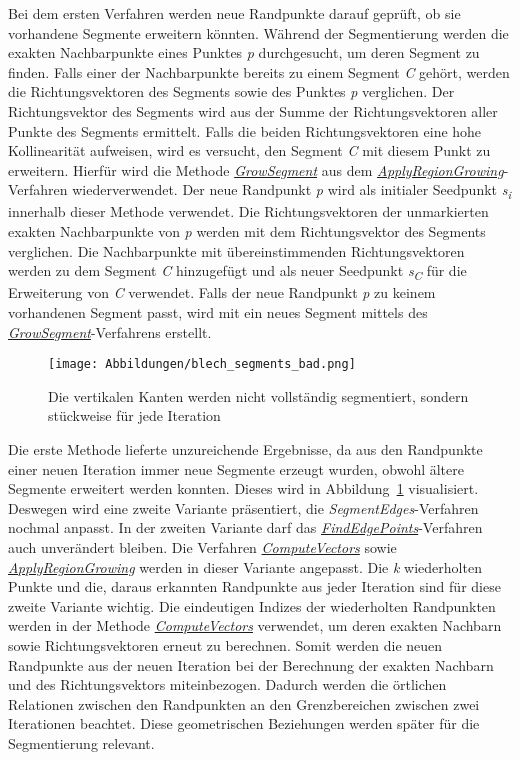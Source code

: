 Bei dem ersten Verfahren werden neue Randpunkte darauf geprüft, ob sie vorhandene Segmente erweitern könnten. Während der Segmentierung werden die exakten Nachbarpunkte eines Punktes \textit{p} durchgesucht, um deren Segment zu finden. Falls einer der Nachbarpunkte bereits zu einem Segment \textit{C} gehört, werden die Richtungsvektoren des Segments sowie des Punktes \textit{p} verglichen. Der Richtungsvektor des Segments wird aus der Summe der Richtungsvektoren aller Punkte des Segments ermittelt. Falls die beiden Richtungsvektoren eine hohe Kollinearität aufweisen, wird es versucht, den Segment \textit{C} mit diesem Punkt zu erweitern. Hierfür wird die Methode \textit{\hyperref[alg:grow_segment]{GrowSegment}} aus dem \textit{\hyperref[alg:apply_region_growing]{ApplyRegionGrowing}}-Verfahren wiederverwendet. Der neue Randpunkt \textit{p} wird als initialer Seedpunkt \textit{s\textsubscript{i}} innerhalb dieser Methode verwendet. Die Richtungsvektoren der unmarkierten exakten Nachbarpunkte von \textit{p} werden mit dem Richtungsvektor des Segments verglichen. Die Nachbarpunkte mit übereinstimmenden Richtungsvektoren werden zu dem Segment \textit{C} hinzugefügt und als neuer Seedpunkt \textit{s\textsubscript{C}} für die Erweiterung von \textit{C} verwendet. Falls der neue Randpunkt \textit{p} zu keinem vorhandenen Segment passt, wird mit ein neues Segment mittels des \textit{\hyperref[alg:grow_segment]{GrowSegment}}-Verfahrens erstellt.

\begin{figure}[b!]
	\texttt{[image: Abbildungen/blech\_segments\_bad.png]}
	\centering
	\caption[Falsch segmentierte Kanten]{Die vertikalen Kanten werden nicht vollständig segmentiert, sondern stückweise für jede Iteration}
	\label{fig: bad_segments}
\end{figure}

Die erste Methode lieferte unzureichende Ergebnisse, da aus den Randpunkte einer neuen Iteration immer neue Segmente erzeugt wurden, obwohl ältere Segmente erweitert werden konnten. Dieses wird in Abbildung~\ref{fig: bad_segments} visualisiert. Deswegen wird eine zweite Variante präsentiert, die \textit{SegmentEdges}-Verfahren nochmal anpasst. In der zweiten Variante darf das \textit{\hyperref[alg:find_edge_points]{FindEdgePoints}}-Verfahren auch unverändert bleiben. Die Verfahren \textit{\hyperref[alg:compute_vectors]{ComputeVectors}} sowie \textit{\hyperref[alg:apply_region_growing]{ApplyRegionGrowing}} werden in dieser Variante angepasst. Die \textit{k} wiederholten Punkte und die, daraus erkannten Randpunkte aus jeder Iteration sind für diese zweite Variante wichtig. Die eindeutigen Indizes der wiederholten Randpunkten werden in der Methode \textit{\hyperref[alg:compute_vectors]{ComputeVectors}} verwendet, um deren exakten Nachbarn sowie Richtungsvektoren erneut zu berechnen. Somit werden die neuen Randpunkte aus der neuen Iteration bei der Berechnung der exakten Nachbarn und des Richtungsvektors miteinbezogen. Dadurch werden die örtlichen Relationen zwischen den Randpunkten an den Grenzbereichen zwischen zwei Iterationen beachtet. Diese geometrischen Beziehungen werden später für die Segmentierung relevant.

